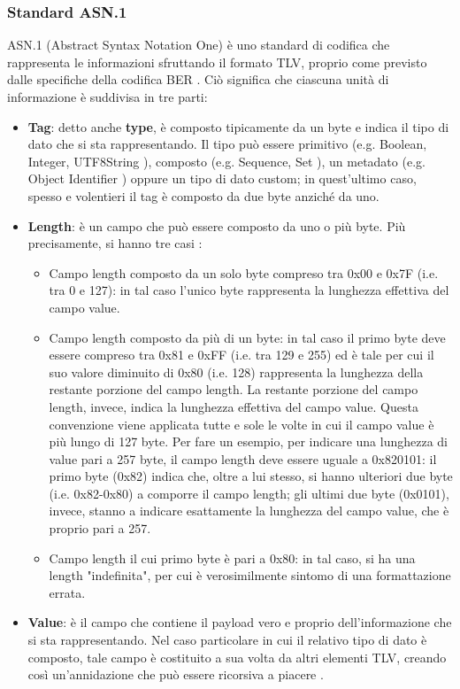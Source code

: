\documentclass[10pt, oneside]{book}
\begin{document}
\subsubsection{Standard ASN.1}
ASN.1 (Abstract Syntax Notation One) è uno standard di codifica che rappresenta le informazioni sfruttando il formato TLV, proprio come previsto dalle specifiche della codifica BER \cite{RFC-6025}\cite{ASN1}. Ciò significa che ciascuna unità di informazione è suddivisa in tre parti:
\begin{itemize}
\item \textbf{Tag}: detto anche \textbf{type}, è composto tipicamente da un byte e indica il tipo di dato che si sta rappresentando. Il tipo può essere primitivo (e.g. Boolean, Integer, UTF8String \cite{ASN1-types}), composto (e.g. Sequence, Set \cite{ASN1-types}), un metadato (e.g. Object Identifier \cite{ASN1-types}) oppure un tipo di dato custom; in quest'ultimo caso, spesso e volentieri il tag è composto da due byte anziché da uno.
\item \textbf{Length}: è un campo che può essere composto da uno o più byte. Più precisamente, si hanno tre casi \cite{ASN1}:
\begin{itemize}[itemsep=0pt]
\item Campo length composto da un solo byte compreso tra 0x00 e 0x7F (i.e. tra 0 e 127): in tal caso l'unico byte rappresenta la lunghezza effettiva del campo value.
\item Campo length composto da più di un byte: in tal caso il primo byte deve essere compreso tra 0x81 e 0xFF (i.e. tra 129 e 255) ed è tale per cui il suo valore diminuito di 0x80 (i.e. 128) rappresenta la lunghezza della restante porzione del campo length. La restante porzione del campo length, invece, indica la lunghezza effettiva del campo value. Questa convenzione viene applicata tutte e sole le volte in cui il campo value è più lungo di 127 byte. Per fare un esempio, per indicare una lunghezza di value pari a 257 byte, il campo length deve essere uguale a 0x820101: il primo byte (0x82) indica che, oltre a lui stesso, si hanno ulteriori due byte (i.e. 0x82-0x80) a comporre il campo length; gli ultimi due byte (0x0101), invece, stanno a indicare esattamente la lunghezza del campo value, che è proprio pari a 257.
\item Campo length il cui primo byte è pari a 0x80: in tal caso, si ha una length "indefinita", per cui è verosimilmente sintomo di una formattazione errata.
\end{itemize}
\item \textbf{Value}: è il campo che contiene il payload vero e proprio dell'informazione che si sta rappresentando. Nel caso particolare in cui il relativo tipo di dato è composto, tale campo è costituito a sua volta da altri elementi TLV, creando così un'annidazione che può essere ricorsiva a piacere \cite{ASN1}.
\end{itemize}
\end{document}

